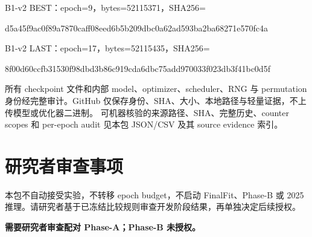 \documentclass[UTF8,a4paper,11pt,fontset=windows]{ctexart}
\begin{document}
{\footnotesize\raggedright{}\par}
B1-v2 BEST：epoch=9，bytes=52115371，SHA256=\par
{\footnotesize\ttfamily d5a45f9ac0f89a7870caff08eed6b5b209dbc0a62ad593ba2ba68271e570fc4a}\par
{\footnotesize\raggedright{}\par}
B1-v2 LAST：epoch=17，bytes=52115435，SHA256=\par
{\footnotesize\ttfamily 8f00d60ccfb31530f98dbd3b86c919cda6dbc75add970033f023db3f41bc0d5f}\par
{\footnotesize\raggedright{}\par}
所有 checkpoint 文件和内部 model、optimizer、scheduler、RNG 与 permutation 身份经完整审计。GitHub 仅保存身份、SHA、大小、本地路径与轻量证据，不上传模型或优化器二进制。
可机器核验的来源路径、SHA、完整历史、counter scopes 和 per-epoch audit 见本包 JSON/CSV 及其 source evidence 索引。
\section{研究者审查事项}
本包不自动接受实验，不转移 epoch budget，不启动 FinalFit、Phase-B 或 2025 推理。请研究者基于已冻结比较规则审查开发阶段结果，再单独决定后续授权。
\par\textbf{需要研究者审查配对 Phase-A；Phase-B 未授权。}\par
\end{document}
